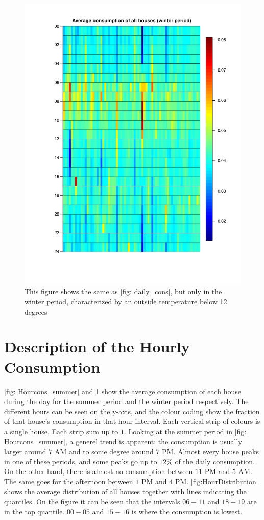 \begin{figure}
    \centering
    \includegraphics[width=\textwidth]{../../../figures/Heatmap_winter.pdf}
    \caption{This figure shows the same as \cref{fig: daily_cons}, but only in the winter period, characterized by an outside temperature below 12 degrees}
    \label{fig: Hourcons_winter}
\end{figure}

%
\section{Description of the Hourly Consumption}
\noindent \cref{fig: Hourcons_summer} and \cref{fig: Hourcons_winter} show the average consumption of each house during the day for the summer period and the winter period respectively. The different hours can be seen on the y-axis, and the colour coding show the fraction of that house's consumption in that hour interval. Each vertical strip of colours is a single house. Each strip sum up to $1$. Looking at the summer period in \cref{fig: Hourcons_summer}, a generel trend is apparent: the consumption is usually larger around $7$ AM and to some degree around $7$ PM. Almost every house peaks in one of these periods, and some peaks go up to $12\%$ of the daily consumption. On the other hand, there is almost no consumption between $11$ PM and $5$ AM. The same goes for the afternoon between $1$ PM and $4$ PM. \cref{fig:HourDistribution} shows the average distribution of all houses together with lines indicating the quantiles. On the figure it can be seen that the intervals $06-11$ and $18-19$ are in the top quantile. $00-05$ and $15-16$ is where the consumption is lowest.


